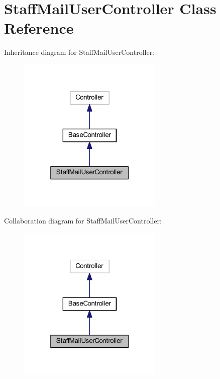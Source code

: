 \hypertarget{class_staff_mail_user_controller}{}\section{Staff\+Mail\+User\+Controller Class Reference}
\label{class_staff_mail_user_controller}


Inheritance diagram for Staff\+Mail\+User\+Controller\+:
\nopagebreak
\begin{figure}[H]
\begin{center}
\leavevmode
\includegraphics[width=196pt]{class_staff_mail_user_controller__inherit__graph}
\end{center}
\end{figure}


Collaboration diagram for Staff\+Mail\+User\+Controller\+:
\nopagebreak
\begin{figure}[H]
\begin{center}
\leavevmode
\includegraphics[width=196pt]{class_staff_mail_user_controller__coll__graph}
\end{center}
\end{figure}
